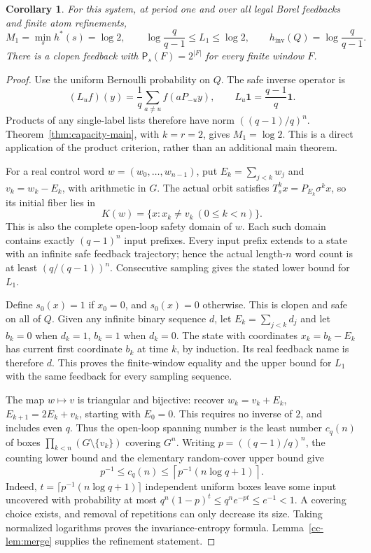 \documentclass[11pt,reqno]{amsart}
\numberwithin{equation}{section}
\newtheorem{corollary}[theorem]{Corollary}
\theoremstyle{definition}
\newcommand{\Patt}{\mathsf P}
\newcommand{\hinv}{h_{\mathrm{inv}}}
\newcommand{\one}{\mathbf 1}
\begin{document}
\begin{corollary}\label{cor:cyclic}
For this system, at period one and over all legal Borel feedbacks
and finite atom refinements,
\[
 M_1=\min_s h^*(s)=\log2,\qquad
 \log\frac q{q-1}\le L_1\le\log2,\qquad
 \hinv(Q)=\log\frac q{q-1}.
\]
There is a clopen feedback with $\Patt_s(F)=2^{|F|}$ for every
finite window $F$.
\end{corollary}
\begin{proof}
Use the uniform Bernoulli probability on $Q$. The safe inverse
operator is
\[
 (L_uf)(y)=\frac1q\sum_{a\ne u}f(aP_{-u}y),
 \qquad L_u\one=\frac{q-1}{q}\one.
\]
Products of any single-label lists therefore have norm
$((q-1)/q)^n$. Theorem~\ref{thm:capacity-main}, with $k=r=2$,
gives $M_1=\log2$. This is a direct application of the product
criterion, rather than an additional main theorem.

For a real control word $w=(w_0,\ldots,w_{n-1})$, put
$E_k=\sum_{j<k}w_j$ and $v_k=w_k-E_k$, with arithmetic in $G$.
The actual orbit satisfies $T_s^kx=P_{E_k}\sigma^kx$, so its
initial fiber lies in
\[
 K(w)=\{x:x_k\ne v_k\ (0\le k<n)\}.
\]
This is also the complete open-loop safety domain of $w$.
Each such domain contains exactly $(q-1)^n$ input prefixes.
Every input prefix extends to a state with an infinite safe
feedback trajectory; hence the actual length-$n$ word count is
at least $(q/(q-1))^n$. Consecutive sampling gives the stated
lower bound for $L_1$.

Define $s_0(x)=1$ if $x_0=0$, and $s_0(x)=0$ otherwise.
This is clopen and safe on all of $Q$. Given any infinite binary
sequence $d$, let $E_k=\sum_{j<k}d_j$ and let $b_k=0$ when
$d_k=1$, $b_k=1$ when $d_k=0$. The state with coordinates
$x_k=b_k-E_k$ has current first coordinate $b_k$ at time $k$,
by induction. Its real feedback name is therefore $d$.
This proves the finite-window equality and the upper bound for
$L_1$ with the same feedback for every sampling sequence.

The map $w\mapsto v$ is triangular and bijective: recover
$w_k=v_k+E_k$, $E_{k+1}=2E_k+v_k$, starting with $E_0=0$.
This requires no inverse of $2$, and includes even $q$.
Thus the open-loop spanning number is the least number $c_q(n)$
of boxes $\prod_{k<n}(G\setminus\{v_k\})$ covering $G^n$.
Writing $p=((q-1)/q)^n$, the counting lower bound and the
elementary random-cover upper bound give
\[
 p^{-1}\le c_q(n)\le
 \left\lceil p^{-1}(n\log q+1)\right\rceil.
\]
Indeed, $t=\lceil p^{-1}(n\log q+1)\rceil$ independent uniform
boxes leave some input uncovered with probability at most
$q^n(1-p)^t\le q^ne^{-pt}\le e^{-1}<1$.
A covering choice exists, and removal of repetitions can only
decrease its size. Taking normalized logarithms proves the
invariance-entropy formula. Lemma~\ref{cc-lem:merge} supplies
the refinement statement.
\end{proof}
\end{document}
